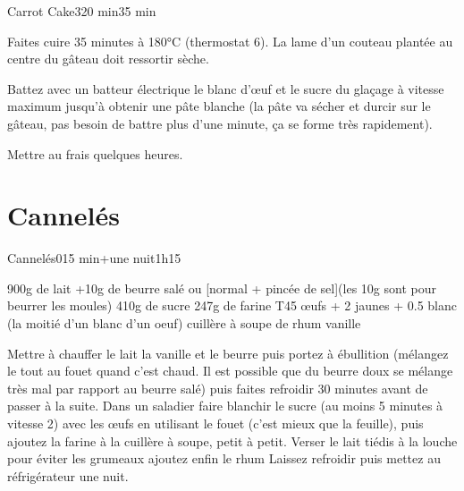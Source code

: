 {\begin{recette}{Carrot Cake}{3}{20 min}{35 min}
\begin{cuisson}
Faites cuire 35 minutes à 180°C (thermostat 6). La lame d'un couteau plantée au centre du gâteau doit ressortir sèche.

Battez avec un batteur électrique le blanc d'œuf et le sucre du glaçage à vitesse maximum jusqu'à obtenir une pâte blanche (la 
pâte va 
sécher et durcir sur le gâteau, pas besoin de battre plus d'une minute, ça se forme très rapidement).

Mettre au frais quelques heures.
\end{cuisson}
\end{recette}

\section{Cannelés}
\begin{recette}{Cannelés}{0}{15 min+une nuit}{1h15}
\begin{ingredients}
\ingredient 900g de lait 
+10g de beurre salé ou [normal + pincée de sel](les 10g sont pour beurrer les moules)
\ingredient 410g de sucre
\ingredient 247g de farine T45
 œufs + 2 jaunes + 0.5 blanc (la moitié d'un blanc d'un oeuf)
 cuillère à soupe de rhum
\ingredient vanille
\end{ingredients}
% 

\begin{preparation}
\etape Mettre à chauffer le lait la vanille et le beurre puis portez à ébullition (mélangez le tout au fouet quand c'est chaud. Il est possible que du beurre doux se mélange très mal par rapport au beurre salé)
puis faites refroidir 30 minutes avant de passer à la suite.
\etape Dans un saladier faire blanchir le sucre (au moins 5 minutes à vitesse 2) avec les œufs en utilisant le fouet (c'est mieux que la feuille), puis ajoutez la farine à la cuillère à soupe, petit à petit.
\etape Verser le lait tiédis à la louche pour éviter les grumeaux
\etape ajoutez enfin le rhum
\etape Laissez refroidir puis mettez au réfrigérateur une nuit.
\end{preparation}


\end{recette}}
